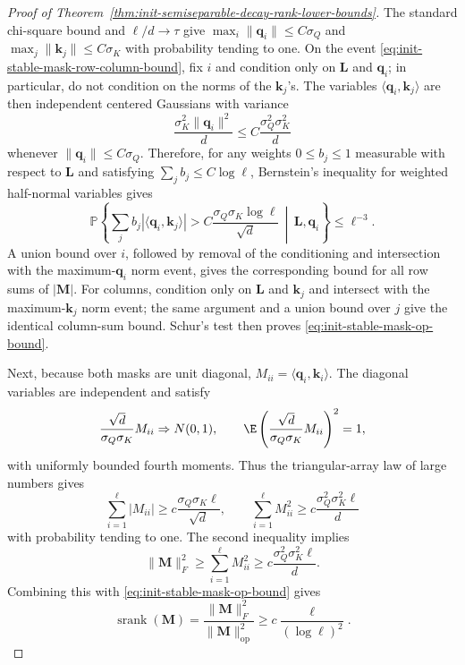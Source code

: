 \documentclass{article}
\newcommand{\Prob}{\mathbb{P}}
\newcommand{\srank}{\operatorname{srank}}
\newcommand{\op}{\operatorname{op}}
\newcommand{\weak}{\Rightarrow}
\newcommand{\bM}{\mathbf{M}}
\newcommand{\bL}{\mathbf{L}}
\theoremstyle{definition}
\theoremstyle{remark}
\begin{document}
\begin{proof}[Proof of Theorem~\ref{thm:init-semiseparable-decay-rank-lower-bounds}]
The standard chi-square bound and $\ell/d\to\tau$ give
$\max_i\|\mathbf q_i\|\leq C\sigma_Q$ and
$\max_j\|\mathbf k_j\|\leq C\sigma_K$ with probability tending to one.  On the
event \eqref{eq:init-stable-mask-row-column-bound}, fix $i$ and condition only on
$\bL$ and $\mathbf q_i$; in particular, do not condition on the norms of the
$\mathbf k_j$'s.  The variables
$\langle \mathbf q_i,\mathbf k_j\rangle$ are then independent centered Gaussians
with variance
\[
    \frac{\sigma_K^2\|\mathbf q_i\|^2}{d}
    \leq
    C\frac{\sigma_Q^2\sigma_K^2}{d}
\]
whenever $\|\mathbf q_i\|\leq C\sigma_Q$.  Therefore, for any weights
$0\leq b_j\leq1$ measurable with respect to $\bL$ and satisfying
$\sum_j b_j\leq C\log\ell$, Bernstein's inequality for weighted half-normal
variables gives
\[
    \Prob\left\{
    \sum_j b_j |\langle \mathbf q_i,\mathbf k_j\rangle|
    >
    C\frac{\sigma_Q\sigma_K\log\ell}{\sqrt d}
    \,\middle|\, \bL,\mathbf q_i
    \right\}
    \leq
    \ell^{-3}.
\]
A union bound over $i$, followed by removal of the conditioning and intersection
with the maximum-$\mathbf q_i$ norm event, gives the corresponding bound for all
row sums of $|\bM|$.  For columns, condition only on $\bL$ and $\mathbf k_j$ and
intersect with the maximum-$\mathbf k_j$ norm event; the same argument and a
union bound over $j$ give the identical column-sum bound.  Schur's test then
proves \eqref{eq:init-stable-mask-op-bound}.

Next, because both masks are unit diagonal,
$M_{ii}=\langle \mathbf q_i,\mathbf k_i\rangle$.  The diagonal variables are
independent and satisfy
\[
    \frac{\sqrt d}{\sigma_Q\sigma_K}M_{ii}\weak N(0,1),
    \qquad
    \E\left(\frac{\sqrt d}{\sigma_Q\sigma_K}M_{ii}\right)^2=1,
\]
with uniformly bounded fourth moments.  Thus the triangular-array law of large
numbers gives
\begin{equation}
    \sum_{i=1}^{\ell}|M_{ii}|
    \geq
    c\frac{\sigma_Q\sigma_K\ell}{\sqrt d},
    \qquad
    \sum_{i=1}^{\ell}M_{ii}^2
    \geq
    c\frac{\sigma_Q^2\sigma_K^2\ell}{d}
    \label{eq:init-diagonal-mass-lower-bound}
\end{equation}
with probability tending to one.  The second inequality implies
\[
    \|\bM\|_F^2
    \geq
    \sum_{i=1}^{\ell}M_{ii}^2
    \geq
    c\frac{\sigma_Q^2\sigma_K^2\ell}{d}.
\]
Combining this with \eqref{eq:init-stable-mask-op-bound} gives
\[
    \srank(\bM)
    =
    \frac{\|\bM\|_F^2}{\|\bM\|_{\op}^2}
    \geq
    c\frac{\ell}{(\log\ell)^2}.
\]


\end{proof}
\end{document}
